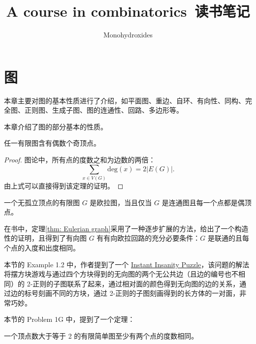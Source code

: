 \documentclass[cn,hazy,sakura,14pt,normal]{elegantnote}
\title{A course in combinatorics\ 读书笔记}
\author{Monohydroxides}
\date{\zhtoday}
\begin{document}
\maketitle

\newpage

\tableofcontents

\newpage

\setcounter{page}{1}

\section{图} \label{sec: graph}

本章主要对图的基本性质进行了介绍，如平面图、重边、自环、有向性、同构、完全图、正则图、生成子图、图的连通性、回路、多边形等。

本章介绍了图的部分基本的性质。

\begin{theorem} \label{thm: First theorem of graph theory}
    任一有限图含有偶数个奇顶点。
\end{theorem}

\begin{proof}
    图论中，所有点的度数之和为边数的两倍：
    \begin{equation}
    \sum_{x \in V(G)} \text{deg}(x) = 2 \left| E(G) \right|.
    \end{equation}
    由上式可以直接得到该定理的证明。
\end{proof}

\begin{theorem} \label{thm: Eulerian graph}
    一个无孤立顶点的有限图 $G$ 是欧拉图，当且仅当 $G$ 是连通图且每一个点都是偶顶点。
\end{theorem}

在书中，定理\ref{thm: Eulerian graph}采用了一种逐步扩展的方法，给出了一个构造性的证明，且得到了有向图 $G$ 有有向欧拉回路的充分必要条件：$G$ 是联通的且每个点的入度和出度相同。

本节的 Example 1.2 中，作者提到了一个 \href{https://en.wikipedia.org/wiki/Instant\_Insanity}{Instant Insanity Puzzle}，该问题的解法将摆方块游戏与通过四个方块得到的无向图的两个无公共边（且边的编号也不相同）的 2-正则的子图联系了起来，通过相对面的颜色得到无向图的边的关系，通过边的标号刻画不同的方块，通过 2-正则的子图刻画得到的长方体的一对面，非常巧妙。

本节的 Problem 1G 中，提到了一个定理：

\begin{theorem}
    一个顶点数大于等于 2 的有限简单图至少有两个点的度数相同。
\end{theorem}
\end{document}
